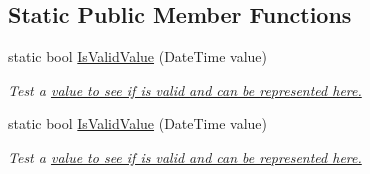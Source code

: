 \subsection*{Static Public Member Functions}
\begin{DoxyCompactItemize}
\item 
static bool \hyperlink{class_i_c_sharp_code_1_1_sharp_zip_lib_1_1_zip_1_1_extended_unix_data_a2643cdcd65d1e051056701e0255596ca}{Is\+Valid\+Value} (Date\+Time value)
\begin{DoxyCompactList}\small\item\em Test a \hyperlink{}{value to see if is valid and can be represented here.} \end{DoxyCompactList}\item 
static bool \hyperlink{class_i_c_sharp_code_1_1_sharp_zip_lib_1_1_zip_1_1_extended_unix_data_a2643cdcd65d1e051056701e0255596ca}{Is\+Valid\+Value} (Date\+Time value)
\begin{DoxyCompactList}\small\item\em Test a \hyperlink{}{value to see if is valid and can be represented here.} \end{DoxyCompactList}\end{DoxyCompactItemize}

